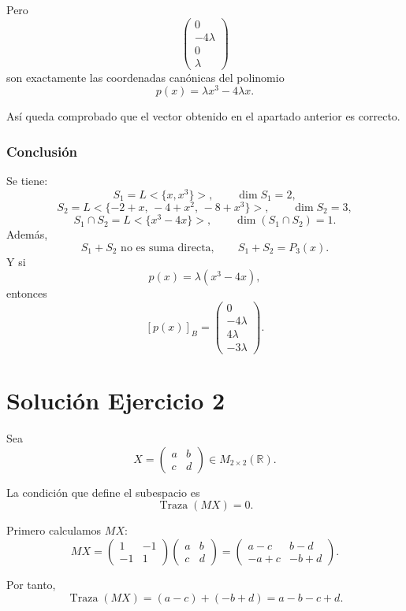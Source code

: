 \documentclass[12pt]{article}
\begin{document}
Pero
\[
\begin{pmatrix}
0\\
-4\lambda\\
0\\
\lambda
\end{pmatrix}
\]
son exactamente las coordenadas canónicas del polinomio
\[
p(x)=\lambda x^3-4\lambda x.
\]

Así queda comprobado que el vector obtenido en el apartado anterior es correcto.

\subsubsection*{Conclusión}

Se tiene:
\[
S_1=L<\{x,x^3\}>,\qquad \dim S_1=2,
\]
\[
S_2=L<\{-2+x,\,-4+x^2,\,-8+x^3\}>,\qquad \dim S_2=3,
\]
\[
S_1\cap S_2=L<\{x^3-4x\}>,\qquad \dim(S_1\cap S_2)=1.
\]
Además,
\[
S_1+S_2 \text{ no es suma directa},
\qquad
S_1+S_2=P_3(x).
\]
Y si
\[
p(x)=\lambda(x^3-4x),
\]
entonces
\[
[p(x)]_B=
\begin{pmatrix}
0\\
-4\lambda\\
4\lambda\\
-3\lambda
\end{pmatrix}.
\]

\section*{Solución Ejercicio 2}

Sea
\[
X=
\begin{pmatrix}
a & b\\
c & d
\end{pmatrix}
\in M_{2\times 2}(\mathbb{R}).
\]

La condición que define el subespacio es
\[
\operatorname{Traza}(MX)=0.
\]

Primero calculamos \(MX\):
\[
MX=
\begin{pmatrix}
1 & -1\\
-1 & 1
\end{pmatrix}
\begin{pmatrix}
a & b\\
c & d
\end{pmatrix}
=
\begin{pmatrix}
a-c & b-d\\
-a+c & -b+d
\end{pmatrix}.
\]

Por tanto,
\[
\operatorname{Traza}(MX)=(a-c)+(-b+d)=a-b-c+d.
\]
\end{document}
